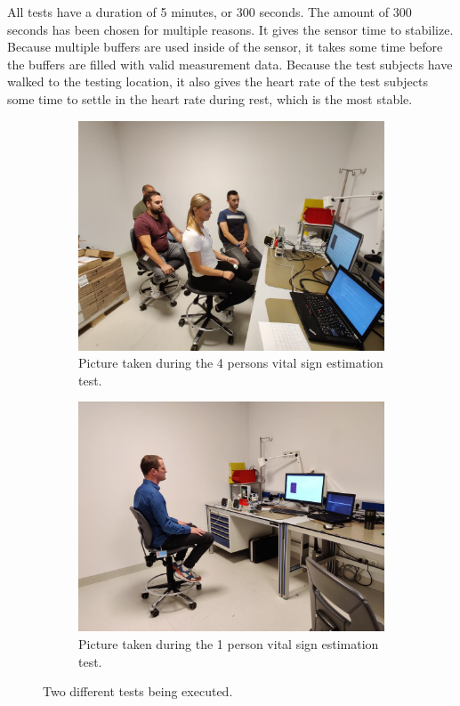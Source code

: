 All tests have a duration of 5 minutes, or 300 seconds. The amount of 300 seconds has been chosen for multiple reasons. It gives the sensor time to stabilize. Because multiple buffers are used inside of the sensor, it takes some time before the buffers are filled with valid measurement data. Because the test subjects have walked to the testing location, it also gives the heart rate of the test subjects some time to settle in the heart rate during rest, which is the most stable.

\begin{figure}[t]
\begin{subfigure}{.45\textwidth}
  \centering
  \includegraphics[width=\linewidth]{figures/validation/layout_4pers.jpeg}  
  \caption{Picture taken during the 4 persons vital sign estimation test.}
  \label{fig:test_setup_4_pic}
\end{subfigure}
\begin{subfigure}{.45\textwidth}
  \centering
  \includegraphics[width=\linewidth]{figures/validation/layout_michiel.jpeg}  
  \caption{Picture taken during the 1 person vital sign estimation test.}
  \label{fig:test_setup_1_pic}
\end{subfigure}
\caption{Two different tests being executed.}
\label{fig:test_setup_pic}
\end{figure}

